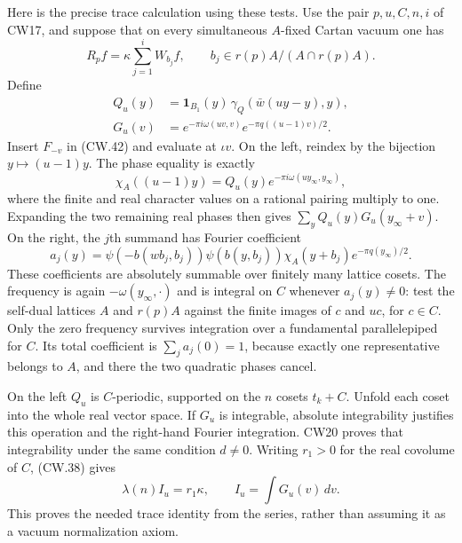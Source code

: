 Here is the precise trace calculation using these tests.  Use the
pair $p,u,C,n,i$ of CW17, and suppose that on every simultaneous
$A$-fixed Cartan vacuum one has
\[
 R_pf=\kappa\sum_{j=1}^{i}W_{b_j}f,\qquad
       b_j\in r(p)A/(A\cap r(p)A).                    \tag{CW.42}
\]
Define
\[
 \begin{split}
 Q_u(y)&=\mathbf1_{B_1}(y)\,
                \gamma_Q(\bar w(uy-y),y),\\
 G_u(v)&=e^{-\pi i\omega(uv,v)}
                     e^{-\pi q((u-1)v)/2}.
 \end{split}                                                   \tag{CW.43}
\]
Insert $F_{-v}$ in (CW.42) and evaluate at $\iota v$.
On the left, reindex by the bijection $y\mapsto(u-1)y$.
The phase equality is exactly
\[
 \chi_A((u-1)y)=Q_u(y)e^{-\pi i\omega(uy_\infty,y_\infty)},
\]
where the finite and real character values on a rational pairing
multiply to one.  Expanding the two remaining real phases then
gives $\sum_y Q_u(y)G_u(y_\infty+v)$.
On the right, the $j$th summand has Fourier coefficient
\[
 a_j(y)=\psi(-b(wb_j,b_j))\psi(b(y,b_j))
                    \chi_A(y+b_j)e^{-\pi q(y_\infty)/2}.
                                                               \tag{CW.44}
\]
These coefficients are absolutely summable over finitely many
lattice cosets.  The frequency is again
$-\omega(y_\infty,\cdot)$ and is integral on $C$ whenever
$a_j(y)\ne0$: test the self-dual lattices $A$ and $r(p)A$
against the finite images of $c$ and $uc$, for $c\in C$.
Only the zero frequency survives integration over a fundamental
parallelepiped for $C$.  Its total coefficient is
$\sum_j a_j(0)=1$, because exactly one representative belongs
to $A$, and there the two quadratic phases cancel.

On the left $Q_u$ is $C$-periodic, supported on the $n$ cosets
$t_k+C$.  Unfold each coset into the whole real vector space.
If $G_u$ is integrable, absolute integrability justifies this
operation and the right-hand Fourier integration.  CW20 proves
that integrability under the same condition $d\ne0$.
Writing $r_1>0$ for the real covolume of $C$, (CW.38) gives
\[
             \lambda(n)I_u=r_1\kappa,
                  \qquad I_u=\int G_u(v)\,dv.          \tag{CW.45}
\]
This proves the needed trace identity from the series, rather
than assuming it as a vacuum normalization axiom.

